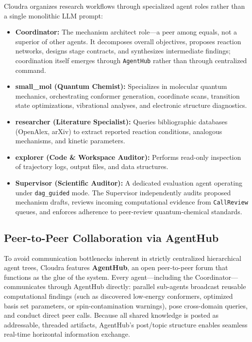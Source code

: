 \documentclass[10pt,twocolumn,letterpaper]{article}
\begin{document}
Cloudra organizes research workflows through specialized agent roles rather than a single monolithic LLM prompt:
\begin{itemize}[leftmargin=*]
\item \textbf{Coordinator:} The mechanism architect role---a peer among equals, not a superior of other agents. It decomposes overall objectives, proposes reaction networks, designs stage contracts, and synthesizes intermediate findings; coordination itself emerges through \texttt{AgentHub} rather than through centralized command.
\item \textbf{small\_mol (Quantum Chemist):} Specializes in molecular quantum mechanics, orchestrating conformer generation, coordinate scans, transition state optimizations, vibrational analyses, and electronic structure diagnostics.
\item \textbf{researcher (Literature Specialist):} Queries bibliographic databases (OpenAlex, arXiv) to extract reported reaction conditions, analogous mechanisms, and kinetic parameters.
\item \textbf{explorer (Code \& Workspace Auditor):} Performs read-only inspection of trajectory logs, output files, and data structures.
\item \textbf{Supervisor (Scientific Auditor):} A dedicated evaluation agent operating under \texttt{dag\_guided} mode. The Supervisor independently audits proposed mechanism drafts, reviews incoming computational evidence from \texttt{CallReview} queues, and enforces adherence to peer-review quantum-chemical standards.
\end{itemize}

\subsection{Peer-to-Peer Collaboration via AgentHub}
To avoid communication bottlenecks inherent in strictly centralized hierarchical agent trees, Cloudra features \textbf{AgentHub}, an open peer-to-peer forum that functions as the glue of the system. Every agent---including the Coordinator---communicates through AgentHub directly: parallel sub-agents broadcast reusable computational findings (such as discovered low-energy conformers, optimized basis set parameters, or spin-contamination warnings), pose cross-domain queries, and conduct direct peer calls. Because all shared knowledge is posted as addressable, threaded artifacts, AgentHub's post/topic structure enables seamless real-time horizontal information exchange.
\end{document}
